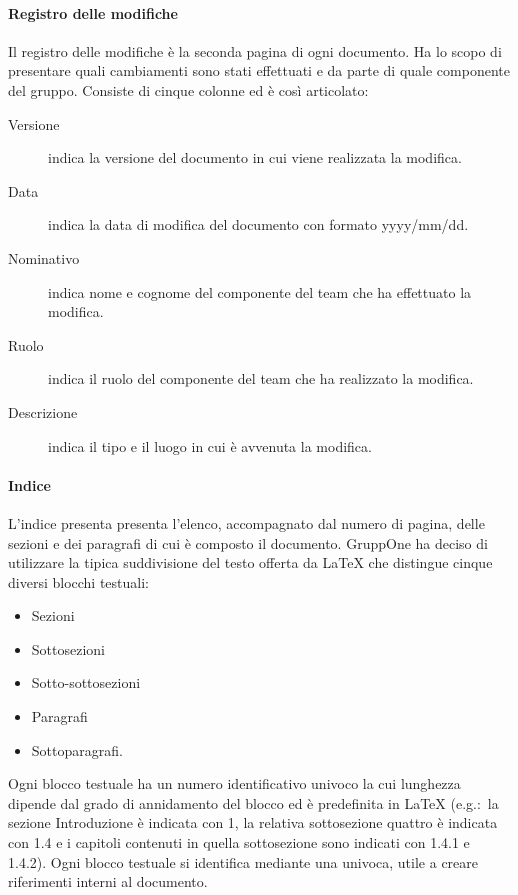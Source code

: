 \documentclass[../norme-di-progetto.tex]{subfiles}
\begin{document}
\paragraph{Registro delle modifiche}%
\label{par:registro_delle_modifiche}
Il registro delle modifiche è la seconda pagina di ogni documento. Ha lo scopo di presentare quali cambiamenti sono stati effettuati e da parte di quale componente del gruppo. Consiste di cinque colonne ed è così articolato:
\begin{description}
  \item [Versione] indica la versione del documento in cui viene realizzata la modifica.
  \item [Data] indica la data di modifica del documento con formato yyyy/mm/dd.
  \item [Nominativo] indica nome e cognome del componente del team che ha effettuato la modifica.
  \item [Ruolo] indica il ruolo del componente del team che ha realizzato la modifica.
  \item [Descrizione] indica il tipo e il luogo in cui è avvenuta la modifica.
\end{description}

\paragraph{Indice}%
\label{par:indice}
L'indice presenta presenta l'elenco, accompagnato dal numero di pagina, delle sezioni e dei paragrafi di cui è composto il documento.
GruppOne ha deciso di utilizzare la tipica suddivisione del testo offerta da \LaTeX{} che distingue cinque diversi blocchi testuali:
\begin{itemize}
  \item Sezioni
  \item Sottosezioni
  \item Sotto-sottosezioni
  \item Paragrafi
  \item Sottoparagrafi.
\end{itemize}

Ogni blocco testuale ha un numero identificativo univoco la cui lunghezza dipende dal grado di annidamento del blocco ed è predefinita in \LaTeX{} (e.g.:\ la sezione Introduzione è indicata con 1, la relativa sottosezione quattro è indicata con 1.4 e i capitoli contenuti in quella sottosezione sono indicati con 1.4.1 e 1.4.2).
Ogni blocco testuale si identifica mediante una  univoca, utile a creare riferimenti interni al documento.
\end{document}

